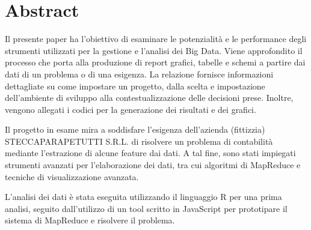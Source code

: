 \section*{Abstract}

Il presente paper ha l'obiettivo di esaminare le potenzialità e le performance degli strumenti utilizzati per la gestione e l'analisi dei Big Data. Viene approfondito il processo che porta alla produzione di report grafici, tabelle e schemi a partire dai dati di un problema o di una esigenza. La relazione fornisce informazioni dettagliate su come impostare un progetto, dalla scelta e impostazione dell'ambiente di sviluppo alla contestualizzazione delle decisioni prese. Inoltre, vengono allegati i codici per la generazione dei risultati e dei grafici.

Il progetto in esame mira a soddisfare l'esigenza dell'azienda (fittizzia) STECCAPARAPETUTTI S.R.L. di risolvere un problema di contabilità mediante l'estrazione di alcune feature dai dati. A tal fine, sono stati impiegati strumenti avanzati per l'elaborazione dei dati, tra cui algoritmi di MapReduce e tecniche di visualizzazione avanzata.

L'analisi dei dati è stata eseguita utilizzando il linguaggio R per una prima analisi, seguito dall'utilizzo di un tool scritto in JavaScript per prototipare il sistema di MapReduce e risolvere il problema.